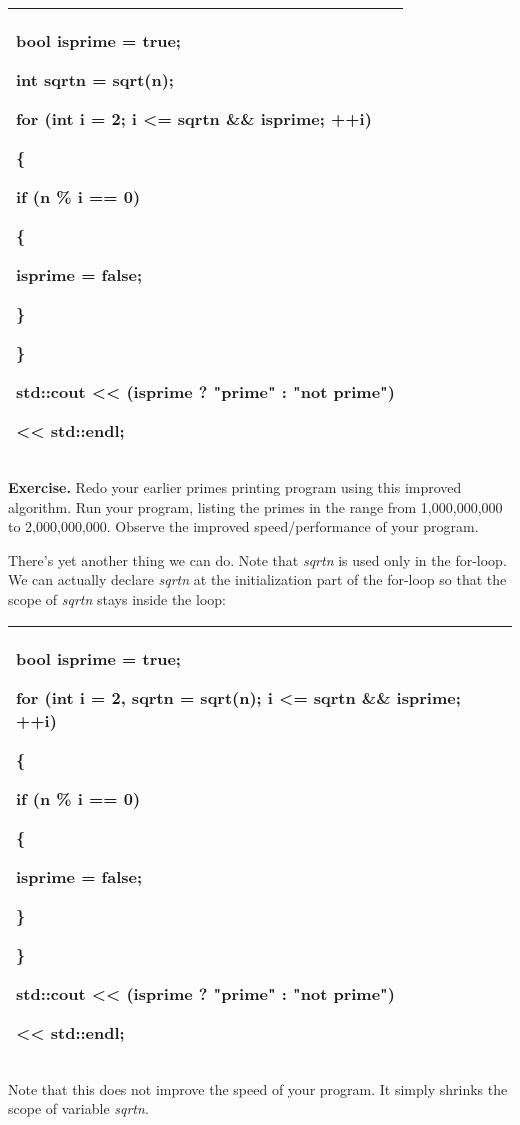 \documentclass[
]{article}
\begin{document}
\begin{longtable}[]{@{}l@{}}
\toprule
\endhead
\begin{minipage}[t]{0.97\columnwidth}\raggedright
bool isprime = true;

int sqrtn = sqrt(n);

for (int i = 2; i \textbf{\textless= sqrtn} \&\& isprime; ++i)

\{

if (n \% i == 0)

\{

isprime = false;

\}

\}

std::cout \textless\textless{} (isprime ? "prime" : "not prime")

\textless\textless{} std::endl;\strut
\end{minipage}\tabularnewline
\bottomrule
\end{longtable}

\textbf{Exercise.} Redo your earlier primes printing program using this
improved algorithm. Run your program, listing the primes in the range
from 1,000,000,000 to 2,000,000,000. Observe the improved
speed/performance of your program.

There's yet another thing we can do. Note that \emph{sqrtn} is used only
in the for-loop. We can actually declare \emph{sqrtn} at the
initialization part of the for-loop so that the scope of \emph{sqrtn}
stays inside the loop:

\begin{longtable}[]{@{}l@{}}
\toprule
\endhead
\begin{minipage}[t]{0.97\columnwidth}\raggedright
bool isprime = true;

for (int i = 2\textbf{, sqrtn = sqrt(n)}; i \textless= sqrtn \&\&
isprime; ++i)

\{

if (n \% i == 0)

\{

isprime = false;

\}

\}

std::cout \textless\textless{} (isprime ? "prime" : "not prime")

\textless\textless{} std::endl;\strut
\end{minipage}\tabularnewline
\bottomrule
\end{longtable}

Note that this does not improve the speed of your program. It simply
shrinks the scope of variable \emph{sqrtn}.
\end{document}
